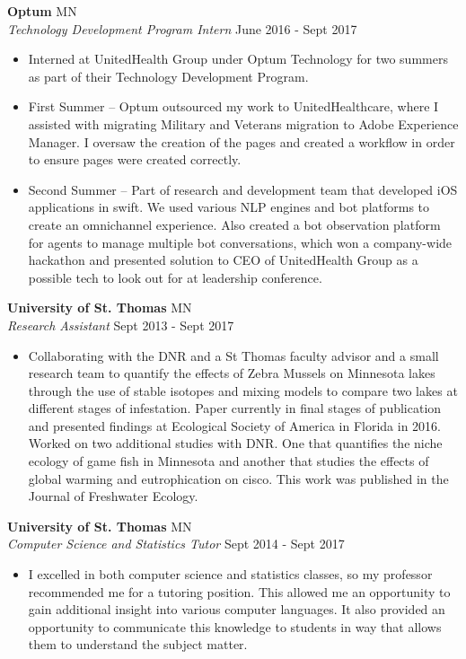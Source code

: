 \documentclass[a4paper]{article}
\begin{document}
\textbf{Optum} \hfill MN\\
\textit{Technology Development Program Intern} \hfill June 2016 - Sept 2017\\
\vspace{-1mm}
\begin{itemize} \itemsep 1pt
	\item Interned at UnitedHealth Group under Optum Technology for two summers as part of their Technology Development Program.
	\item First Summer – Optum outsourced my work to UnitedHealthcare, where I assisted with migrating Military and Veterans migration to Adobe Experience Manager. I oversaw the creation of the pages and created a workflow in order to ensure pages were created correctly.
	\item Second Summer – Part of research and development team that developed iOS applications in swift. We used various NLP engines and bot platforms to create an omnichannel experience. Also created a bot observation platform for agents to manage multiple bot conversations, which won a company-wide hackathon and presented solution to CEO of UnitedHealth Group as a possible tech to look out for at leadership conference.
\end{itemize}
\textbf{University of St. Thomas} \hfill MN\\
\textit{Research Assistant} \hfill Sept 2013 - Sept 2017\\
\vspace{-1mm}
\begin{itemize} \itemsep 1pt
	\item Collaborating with the DNR and a St Thomas faculty advisor and a small research team to quantify the effects of Zebra Mussels on Minnesota lakes through the use of stable isotopes and mixing models to compare two lakes at different stages of infestation. Paper currently in final stages of publication and presented findings at Ecological Society of America in Florida in 2016. Worked on two additional studies with DNR. One that quantifies the niche ecology of game fish in Minnesota and another that studies the effects of global warming and eutrophication on cisco. This work was published in the Journal of Freshwater Ecology.
\end{itemize}
\textbf{University of St. Thomas} \hfill MN\\
\textit{Computer Science and Statistics Tutor} \hfill Sept 2014 - Sept 2017\\
\vspace{-1mm}
\begin{itemize} \itemsep 1pt
	\item I excelled in both computer science and statistics classes, so my professor recommended me for a tutoring position. This allowed me an opportunity to gain additional insight into various computer languages. It also provided an opportunity to communicate this knowledge to students in way that allows them to understand the subject matter.
\end{itemize}
\end{document}
